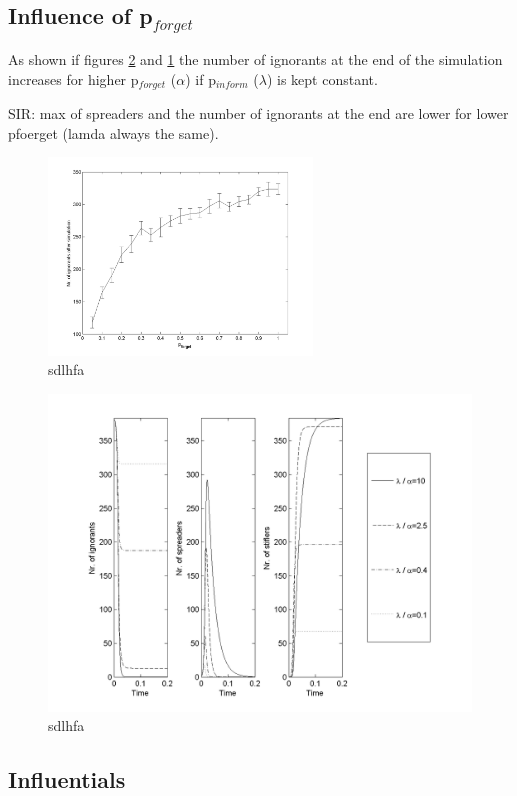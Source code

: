 \subsection{Influence of p$_{forget}$}
As shown if figures \ref{SIR_ODE} and \ref{Analysis_pforget} the number of ignorants at the end of the simulation increases for higher p$_{forget}$ ($\alpha$)  if p$_{inform}$ ($\lambda$) is kept constant.

SIR: max of spreaders and the number of ignorants at the end are lower for lower pfoerget (lamda always the same).

\begin{figure}[H!]
\includegraphics[width=7cm]{Analysis_pforget}
\caption{sdlhfa}
\label{Analysis_pforget}
\end{figure}

\begin{figure}[H!]
\includegraphics[width=14cm]{SIR_ODE}
\caption{sdlhfa}
\label{SIR_ODE}
\end{figure}
\clearpage
\subsection{Influentials}


